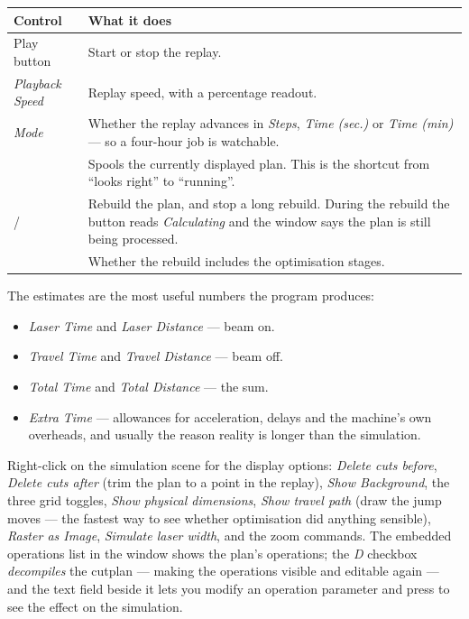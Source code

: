 \begin{center}\small
\begin{tabular}{@{}L{4.0cm}L{10.2cm}@{}}
\toprule
\textbf{Control} & \textbf{What it does} \\
\midrule
Play button & Start or stop the replay. \\
\emph{Playback Speed} & Replay speed, with a percentage readout. \\
\emph{Mode} & Whether the replay advances in \emph{Steps}, \emph{Time (sec.)} or
\emph{Time (min)} --- so a four-hour job is watchable. \\
 & Spools the currently displayed plan. This is the
shortcut from ``looks right'' to ``running''. \\
 /  & Rebuild the plan, and stop a long
rebuild. During the rebuild the button reads \emph{Calculating} and the window
says the plan is still being processed. \\
 & Whether the rebuild includes the optimisation stages. \\
\bottomrule
\end{tabular}
\end{center}

\noindent The estimates are the most useful numbers the program produces:

\begin{itemize}
  \item \emph{Laser Time} and \emph{Laser Distance} --- beam on.
  \item \emph{Travel Time} and \emph{Travel Distance} --- beam off.
  \item \emph{Total Time} and \emph{Total Distance} --- the sum.
  \item \emph{Extra Time} --- allowances for acceleration, delays and the machine's
        own overheads, and usually the reason reality is longer than the
        simulation.
\end{itemize}

\noindent Right-click on the simulation scene for the display options:
\emph{Delete cuts before}, \emph{Delete cuts after} (trim the plan to a point in
the replay), \emph{Show Background}, the three grid toggles, \emph{Show physical
dimensions}, \emph{Show travel path} (draw the jump moves --- the fastest way to
see whether optimisation did anything sensible), \emph{Raster as Image},
\emph{Simulate laser width}, and the zoom commands. The embedded operations list
in the window shows the plan's operations; the \emph{D} checkbox
\emph{decompiles} the cutplan --- making the operations visible and editable
again --- and the text field beside it lets you modify an operation parameter and
press  to see the effect on the simulation.

